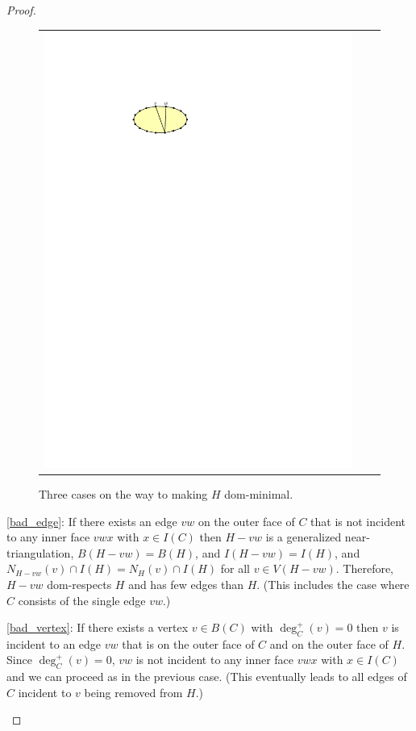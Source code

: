 \documentclass{article}
\theoremstyle{definition}
\begin{document}
\begin{proof}
\begin{figure}
\begin{tabular}{ccc}
      \includegraphics[page=6]{figs/minimal}
    \end{tabular}
    \caption{Three cases on the way to making $H$ dom-minimal.}
    \label{minimal_fig}
  \end{figure}
  \begin{compactenum}
    \item \cref{bad_edge}: If there exists an edge $vw$ on the outer face of $C$ that is not incident to any inner face $vwx$ with $x\in I(C)$ then $H-vw$ is a generalized near-triangulation, $B(H-vw)=B(H)$, and $I(H-vw)=I(H)$, and $N_{H-vw}(v)\cap I(H)=N_{H}(v)\cap I(H)$ for all $v\in V(H-vw)$. Therefore, $H-vw$ dom-respects $H$ and has few edges than $H$. (This includes the case where $C$ consists of the single edge $vw$.)

    \item \cref{bad_vertex}: If there exists a vertex $v\in B(C)$ with $\deg^+_C(v)=0$ then $v$ is incident to an edge $vw$ that is on the outer face of $C$ and on the outer face of $H$. Since $\deg^+_C(v)=0$, $vw$ is not incident to any inner face $vwx$ with $x\in I(C)$ and we can proceed as in the previous case.  (This eventually leads to all edges of $C$ incident to $v$ being removed from $H$.)


\end{compactenum}
\end{proof}
\end{document}
